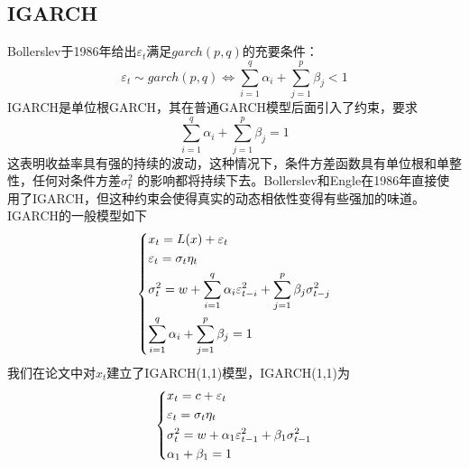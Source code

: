     \subsection{IGARCH}
        Bollerslev于1986年给出$\varepsilon_t$满足$garch(p,q)$的充要条件：
        \[{\varepsilon _t} \sim garch(p,q) \Leftrightarrow \sum\limits_{i = 1}^q {{\alpha _i}}  + \sum\limits_{j = 1}^p {{\beta _j}} < 1\]
        IGARCH是单位根GARCH，其在普通GARCH模型后面引入了约束，要求
        \[\sum\limits_{i = 1}^q {{\alpha _i}}  + \sum\limits_{j = 1}^p {{\beta _j}}  = 1\]
        这表明收益率具有强的持续的波动，这种情况下，条件方差函数具有单位根和单整性，任何对条件方差$\sigma_t^2$ 的影响都将持续下去。Bollerslev和Engle在1986年直接使用了IGARCH，但这种约束会使得真实的动态相依性变得有些强加的味道。IGARCH的一般模型如下
        \begin{equation*}
        \centering
        \left\{\begin{lgathered}
        {x_t} = L(x) + {\varepsilon _t}\\
        {\varepsilon _t} = {\sigma _t}{\eta _t}\\
        \sigma _t^2 = w + \sum\limits_{i = 1}^q {{\alpha _i}\varepsilon _{t - i}^2}  + \sum\limits_{j = 1}^p {{\beta _j}\sigma _{t - j}^2} \\
        \sum\limits_{i = 1}^q {{\alpha _i}}  + \sum\limits_{j = 1}^p {{\beta _j}}  = 1
        \end{lgathered} \right.
        \end{equation*}
        我们在论文中对$x_t$建立了IGARCH(1,1)模型，IGARCH(1,1)为
        \begin{equation*}
        \centering
        \left\{\begin{lgathered}
        {x_t} = c + {\varepsilon _t}\\
        {\varepsilon _t} = {\sigma _t}{\eta _t}\\
        \sigma _t^2 = w + {\alpha _1}\varepsilon _{t - 1}^2 + {\beta _1}\sigma _{t - 1}^2\\
        {\alpha _1} + {\beta _1} = 1
        \end{lgathered} \right.
        \end{equation*}
